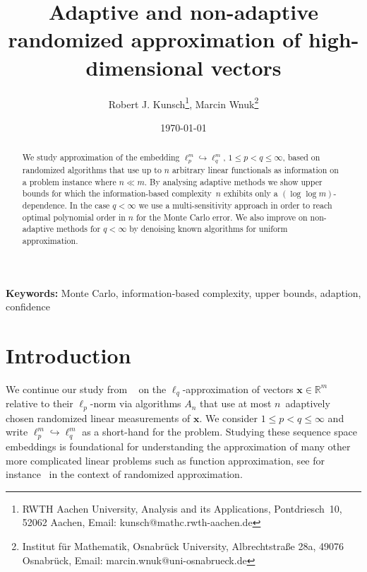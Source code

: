 \documentclass[12pt]{article}
\theoremstyle{plain}
\theoremstyle{definition}
\newcommand{\embed}{\hookrightarrow}
\renewcommand{\vec}{\boldsymbol}
\newcommand{\R}{{\mathbb R}}
\begin{document}
\title{Adaptive and non-adaptive randomized approximation of high-dimensional vectors}

\author{Robert J. Kunsch\thanks{RWTH Aachen University,
Analysis and its Applications,
Pontdriesch~10,
52062 Aachen, Email: kunsch@mathc.rwth-aachen.de},
Marcin Wnuk\thanks{Institut für Mathematik, 
Osnabrück University, Albrechtstraße 28a, 49076 Osnabrück, 
Email: marcin.wnuk@uni-osnabrueck.de}}

\date{\today}

\maketitle
\begin{abstract}
We study approximation of the embedding $\ell_p^m \embed \ell_q^m$, $1 \leq p < q \leq \infty$,
based on randomized algorithms that use up to $n$ arbitrary linear 
functionals as information on a problem instance where $n \ll m$.
By analysing adaptive methods we
show upper bounds
for which the information-based complexity~$n$ 
exhibits only a $(\log\log m)$-dependence.
In the case $q < \infty$ we use a multi-sensitivity approach in order to reach optimal polynomial order in $n$ for the Monte Carlo error.
We also improve on non-adaptive methods for $q < \infty$ by denoising 
known algorithms for uniform approximation.
\end{abstract}

{\bf Keywords: } Monte Carlo, information-based complexity, upper bounds,
adaption, confidence

\section{Introduction}


We continue our study from ~\cite{KNW24,KW24b} on the $\ell_q$-approximation of vectors \mbox{$\vec{x} \in \R^m$} relative to their $\ell_p$-norm
via algorithms $A_n$ that use at most $n$~adaptively chosen randomized linear measurements
of $\vec{x}$.
We consider $1 \leq p < q \leq \infty$ and write $\ell_p^m \embed \ell_q^m$ as a short-hand for the problem.
Studying these sequence space embeddings
is foundational for understanding the approximation of many other more complicated linear problems
such as function approximation, see for instance~\cite{H92,Ma91} in the context of randomized approximation.
\end{document}
